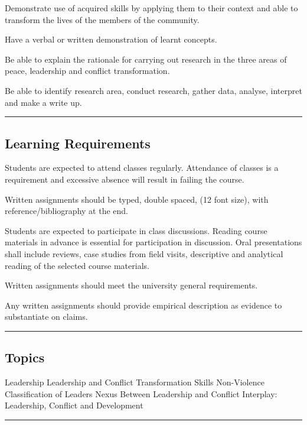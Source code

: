 \begin{outline}
    \1      Demonstrate use of acquired skills by applying them to their context and able to transform the lives of the members of the community.

    \1  	Have a verbal or written demonstration of learnt concepts.

    \1  	Be able to explain the rationale for carrying out research in the three areas of peace, leadership and conflict transformation.

    \1  	Be able to identify research area, conduct research, gather data, analyse, interpret and make a write up.

\end{outline}
\vspace{2ex}\hrule\vspace{2ex}

\subsection*{Learning Requirements}
\begin{outline}
    \1      Students are expected to attend classes regularly. Attendance of classes is a requirement and excessive absence will result in failing the course.

    \1  	Written assignments should be typed, double spaced, (12 font size), with reference/bibliography at the end.

    \1  	Students are expected to participate in class discussions. Reading course materials in advance is essential for participation in discussion. Oral presentations shall include reviews, case studies from field visits, descriptive and analytical reading of the selected course materials.

    \1  	Written assignments should meet the university general requirements.

    \1  	Any written assignments should provide empirical description as evidence to substantiate on claims.

\end{outline}
\vspace{2ex}\hrule\vspace{2ex}



\subsection*{Topics}
\begin{outline}
    \1 Leadership
    \1 Leadership and Conflict Transformation Skills
    \1 Non-Violence
    \1 Classification of Leaders
    \1 Nexus Between Leadership and Conflict
    \1 Interplay: Leadership, Conflict and Development
\end{outline}
\vspace{2ex} \hrule\vspace{2ex}

